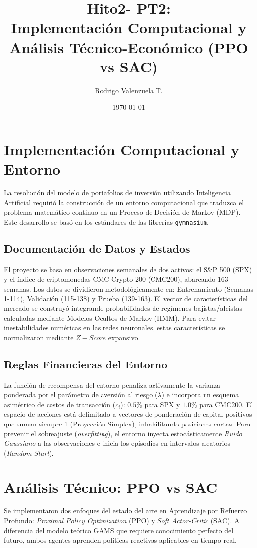 \documentclass[12pt]{article}
\title{Hito2- PT2: \\ \large Implementación Computacional y Análisis Técnico-Económico (PPO vs SAC)}
\author{Rodrigo Valenzuela T.}
\date{\today}
\begin{document}
\maketitle

\section{Implementación Computacional y Entorno}
La resolución del modelo de portafolios de inversión utilizando Inteligencia Artificial requirió la construcción de un entorno computacional que traduzca el problema matemático continuo en un Proceso de Decisión de Markov (MDP). Este desarrollo se basó en los estándares de las librerías \texttt{gymnasium}.

\subsection{Documentación de Datos y Estados}
El proyecto se basa en observaciones semanales de dos activos: el S\&P 500 (SPX) y el índice de criptomonedas CMC Crypto 200 (CMC200), abarcando 163 semanas. Los datos se dividieron metodológicamente en: Entrenamiento (Semanas 1-114), Validación (115-138) y Prueba (139-163).
El vector de características del mercado se construyó integrando probabilidades de regímenes bajistas/alcistas calculadas mediante Modelos Ocultos de Markov (HMM). Para evitar inestabilidades numéricas en las redes neuronales, estas características se normalizaron mediante $Z-Score$ expansivo.

\subsection{Reglas Financieras del Entorno}
La función de recompensa del entorno penaliza activamente la varianza ponderada por el parámetro de aversión al riesgo ($\lambda$) e incorpora un esquema asimétrico de costos de transacción ($c_i$): $0.5\%$ para SPX y $1.0\%$ para CMC200. El espacio de acciones está delimitado a vectores de ponderación de capital positivos que suman siempre 1 (Proyección Símplex), inhabilitando posiciones cortas.
Para prevenir el sobreajuste (\textit{overfitting}), el entorno inyecta estocásticamente \textit{Ruido Gaussiano} a las observaciones e inicia los episodios en intervalos aleatorios (\textit{Random Start}).

\section{Análisis Técnico: PPO vs SAC}
Se implementaron dos enfoques del estado del arte en Aprendizaje por Refuerzo Profundo: \textit{Proximal Policy Optimization} (PPO) y \textit{Soft Actor-Critic} (SAC). A diferencia del modelo teórico GAMS que requiere conocimiento perfecto del futuro, ambos agentes aprenden políticas reactivas aplicables en tiempo real.
\end{document}
